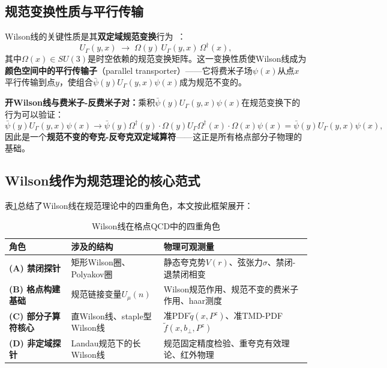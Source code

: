 \documentclass[12pt,a4paper]{ctexart}
\theoremstyle{definition}
\begin{document}
\subsection{规范变换性质与平行传输}

Wilson线的关键性质是其\textbf{双定域规范变换}行为~\cite{GattringerLang2010}：
\begin{equation}
U_\Gamma(y,x) \;\longrightarrow\; \Omega(y)\, U_\Gamma(y,x)\, \Omega^\dagger(x),
\label{eq:gauge_transform_WL}
\end{equation}
其中$\Omega(x)\in SU(3)$是时空依赖的规范变换矩阵。这一变换性质使Wilson线成为\textbf{颜色空间中的平行传输子}（parallel transporter）——它将费米子场$\psi(x)$从点$x$平行传输到点$y$，使组合$\bar\psi(y)U_\Gamma(y,x)\psi(x)$成为规范不变的。

\textbf{开Wilson线与费米子-反费米子对：}乘积$\bar\psi(y) U_\Gamma(y,x) \psi(x)$在规范变换下的行为可以验证：
\begin{equation}
\bar\psi(y)U_\Gamma(y,x)\psi(x) \to \bar\psi(y)\Omega^\dagger(y) \cdot \Omega(y)U_\Gamma\Omega^\dagger(x) \cdot \Omega(x)\psi(x) = \bar\psi(y)U_\Gamma(y,x)\psi(x),
\end{equation}
因此是一个\textbf{规范不变的夸克-反夸克双定域算符}——这正是所有格点部分子物理的基础。

\subsection{Wilson线作为规范理论的核心范式}

表\ref{tab:WL_roles}总结了Wilson线在规范理论中的四重角色，本文按此框架展开：

\begin{table}[H]
\centering
\caption{Wilson线在格点QCD中的四重角色}
\label{tab:WL_roles}
\small
\begin{tabular}{lp{3cm}p{6cm}}
\toprule
角色 & 涉及的结构 & 物理可观测量 \\
\midrule
\textbf{(A) 禁闭探针} &
矩形Wilson圈、Polyakov圈 &
静态夸克势$V(r)$、弦张力$\sigma$、禁闭-退禁闭相变 \\
\textbf{(B) 格点构建基础} &
规范链接变量$U_\mu(n)$ &
Wilson规范作用、规范不变的费米子作用、haar测度 \\
\textbf{(C) 部分子算符核心} &
直Wilson线、staple型Wilson线 &
准PDF$\tilde q(x,P^z)$、准TMD-PDF$\tilde f(x,b_\perp,P^z)$ \\
\textbf{(D) 非定域探针} &
Landau规范下的长Wilson线 &
规范固定精度检验、重夸克有效理论、红外物理 \\
\bottomrule
\end{tabular}
\end{table}
\end{document}
